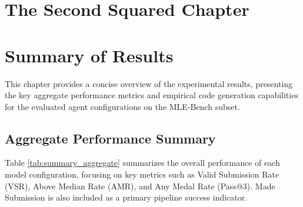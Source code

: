 \chapter{The Second Squared Chapter}
\chapter{Summary of Results}

This chapter provides a concise overview of the experimental results, presenting the key aggregate performance metrics and empirical code generation capabilities for the evaluated agent configurations on the MLE-Bench subset.

\section{Aggregate Performance Summary}

Table \ref{tab:summary_aggregate} summarizes the overall performance of each model configuration, focusing on key metrics such as Valid Submission Rate (VSR), Above Median Rate (AMR), and Any Medal Rate (Pass@3). Made Submission is also included as a primary pipeline success indicator.

